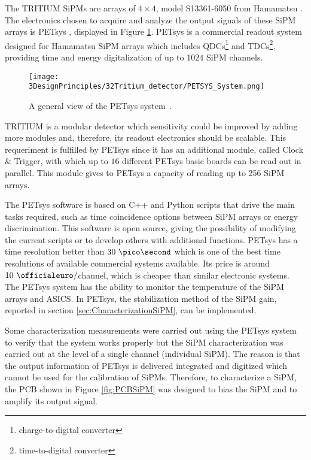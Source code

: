 The TRITIUM SiPMs are arrays of $4\times 4$, model S13361-6050 from Hamamatsu \cite{DataSheetHammamatsu_16_SiPM_50}. The electronics chosen to acquire and analyze the output signals of these SiPM arrays is PETsys \cite{PETSYS}, displayed in Figure \ref{fig:PETSYS}. PETsys is a commercial readout system designed for Hamamatsu SiPM arrays which includes QDCs\footnote{charge-to-digital converter} and TDCs\footnote{time-to-digital converter}, providing time and energy digitalization of up to $1024$ SiPM channels. 

\begin{figure}[h]
\centering
\texttt{[image: 3DesignPrinciples/32Tritium\_detector/PETSYS\_System.png]}
\caption{A general view of the PETsys system\label{fig:PETSYS}~\cite{PETSYS}.}
\end{figure}
TRITIUM is a modular detector which sensitivity could be improved by adding more modules and, therefore, its readout electronics should be scalable. This requeriment is fulfilled by PETsys since it has an additional module, called Clock $\&$ Trigger, with which up to $16$ different PETsys basic boards can be read out in parallel. This module gives to PETsys a capacity of reading up to 256 SiPM arrays. 

The PETsys software is based on C++ and Python scripts that drive the main tasks required, such as time coincidence options between SiPM arrays or energy discrimination. This software is open source, giving the possibility of modifying the current scripts or to develop others with additional functions. PETsys has a time resolution better than $30~\pico\second$ which is one of the best time resolutions of available commercial systems available. Its price is around $10~\officialeuro/$channel, which is cheaper than similar electronic systems. The PETsys system has the ability to monitor the temperature of the SiPM arrays and ASICS. In PETsys, the stabilization method of the SiPM gain, reported in section \ref{sec:CharacterizationSiPM}, can be implemented.

Some characterization measurements were carried out using the PETsys system to verify that the system works properly but the SiPM characterization was carried out at the level of a single channel (individual SiPM). The reason is that the output information of PETsys is delivered integrated and digitized which cannot be used for the calibration of SiPMs. Therefore, to characterize a SiPM, the PCB shown in Figure \ref{fig:PCBSiPM} was designed to bias the SiPM and to amplify its output signal. 

